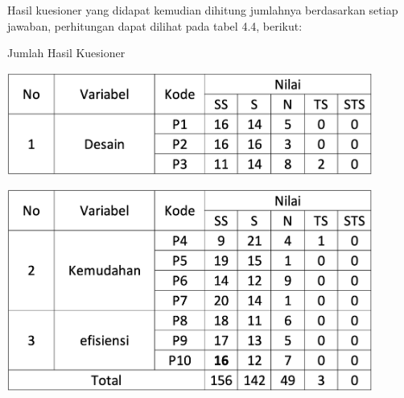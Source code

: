 \begin{flushleft}
\begin{justify}
            \vspace{10cm}
       \newline \noindent Hasil kuesioner yang didapat kemudian dihitung jumlahnya berdasarkan setiap jawaban, perhitungan dapat dilihat pada tabel 4.4, berikut:\\
        \begin{table}[ht]
            \centering
            \caption{Jumlah Hasil Kuesioner}
            \includegraphics[width=12cm]{images/bab 4/hitungan1-fix.png}\\
            \end{table}
        \begin{table}[ht]
            \centering
            \includegraphics[width=12cm]{images/bab 4/hitungan2-fix.png}\\
            \end{table}
            \vspace{8cm}
            

\end{justify}
\end{flushleft}
